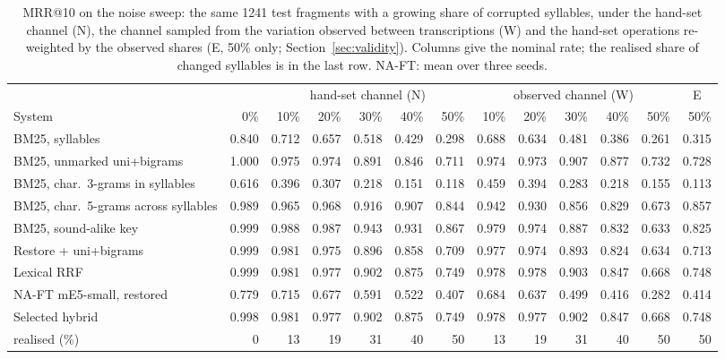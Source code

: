 \begin{table}[t]
\centering
\caption{MRR@10 on the noise sweep: the same 1241 test fragments with a growing share of
corrupted syllables, under the hand-set channel (N), the channel sampled from the variation observed between
transcriptions (W) and the hand-set operations re-weighted by the observed shares (E, 50\% only;
Section~\ref{sec:validity}). Columns give the nominal rate; the realised share of changed syllables is in the
last row. NA-FT: mean over three seeds.}
\label{tab:noise}
\footnotesize
\setlength{\tabcolsep}{3.4pt}
\begin{tabular}{@{}lrrrrrrrrrrrr@{}}
\toprule
 & & \multicolumn{5}{c}{hand-set channel (N)} & \multicolumn{5}{c}{observed channel (W)} & \multicolumn{1}{c}{E} \\
\cmidrule(lr){3-7} \cmidrule(lr){8-12}
System & 0\% & 10\% & 20\% & 30\% & 40\% & 50\% & 10\% & 20\% & 30\% & 40\% & 50\% & 50\% \\
\midrule
BM25, syllables & 0.840 & 0.712 & 0.657 & 0.518 & 0.429 & 0.298 & 0.688 & 0.634 & 0.481 & 0.386 & 0.261 & 0.315 \\
BM25, unmarked uni+bigrams & 1.000 & 0.975 & 0.974 & 0.891 & 0.846 & 0.711 & 0.974 & 0.973 & 0.907 & 0.877 & 0.732 & 0.728 \\
BM25, char.\ 3-grams in syllables & 0.616 & 0.396 & 0.307 & 0.218 & 0.151 & 0.118 & 0.459 & 0.394 & 0.283 & 0.218 & 0.155 & 0.113 \\
BM25, char.\ 5-grams across syllables & 0.989 & 0.965 & 0.968 & 0.916 & 0.907 & 0.844 & 0.942 & 0.930 & 0.856 & 0.829 & 0.673 & 0.857 \\
BM25, sound-alike key & 0.999 & 0.988 & 0.987 & 0.943 & 0.931 & 0.867 & 0.979 & 0.974 & 0.887 & 0.832 & 0.633 & 0.825 \\
Restore + uni+bigrams & 0.999 & 0.981 & 0.975 & 0.896 & 0.858 & 0.709 & 0.977 & 0.974 & 0.893 & 0.824 & 0.634 & 0.713 \\
Lexical RRF & 0.999 & 0.981 & 0.977 & 0.902 & 0.875 & 0.749 & 0.978 & 0.978 & 0.903 & 0.847 & 0.668 & 0.748 \\
NA-FT mE5-small, restored & 0.779 & 0.715 & 0.677 & 0.591 & 0.522 & 0.407 & 0.684 & 0.637 & 0.499 & 0.416 & 0.282 & 0.414 \\
Selected hybrid & 0.998 & 0.981 & 0.977 & 0.902 & 0.875 & 0.749 & 0.978 & 0.977 & 0.902 & 0.847 & 0.668 & 0.748 \\
\midrule
realised (\%) & 0 & 13 & 19 & 31 & 40 & 50 & 13 & 19 & 31 & 40 & 50 & 50 \\
\bottomrule
\end{tabular}
\end{table}
